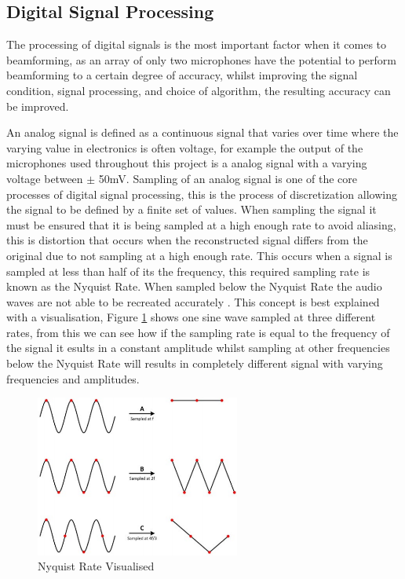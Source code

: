 \documentclass{UoNMCHA}
\numberwithin{equation}{section}
\begin{document}
\newpage
\subsection{Digital Signal Processing} \label{sec:Signal Processing}
    The processing of digital signals is the most important factor when it comes to beamforming, as an array of only two microphones have the potential to perform beamforming to a certain degree of accuracy, whilst improving the signal condition, signal processing, and choice of algorithm, the resulting accuracy can be improved.
    
    An analog signal is defined as a continuous signal that varies over time where the varying value in electronics is often voltage, for example the output of the microphones used throughout this project is a analog signal with a varying voltage between $\pm$ 50mV. Sampling of an analog signal is one of the core processes of digital signal processing, this is the process of discretization allowing the signal to be defined by a finite set of values. When sampling the signal it must be ensured that it is being sampled at a high enough rate to avoid aliasing, this is distortion that occurs when the reconstructed signal differs from the original due to not sampling at a high enough rate. This occurs when a signal is sampled at less than half of its the frequency, this required sampling rate is known as the Nyquist Rate. When sampled below the Nyquist Rate the audio waves are not able to be recreated accurately \citep{Ben08}. This concept is best explained with a visualisation, Figure \ref{fig:NyquistFrequency} shows one sine wave sampled at three different rates, from this we can see how if the sampling rate is equal to the frequency of the signal it esults in a constant amplitude whilst sampling at other frequencies below the Nyquist Rate will results in completely different signal with varying frequencies and amplitudes. 

    \begin{figure}[H]
        \centering
        \includegraphics[keepaspectratio, width = 0.6\textwidth]{Figures/NyquistFrequency.png}
        \caption{Nyquist Rate Visualised \citep{NINyq}}
        \label{fig:NyquistFrequency}
    \end{figure}
    
\end{document}
